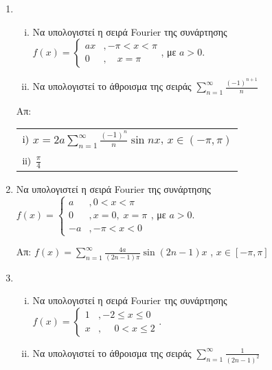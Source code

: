 



\usepackage{microtype} 
\everymath{\displaystyle}


\begin{center}
\end{center}


\vspace{\baselineskip}

\begin{enumerate}


	\item 
		\begin{enumerate}[i)]
			\item Να υπολογιστεί η σειρά  \textlatin{Fourier}  της συνάρτησης  
				$ f(x)= \begin{cases}
					ax &, - \pi < x < \pi \\
					0 &,\quad x = \pi 
				\end{cases}  $, με $ a>0 $.
			\item Να υπολογιστεί το άθροισμα της σειράς $ \sum_{n=1}^{\infty} \frac{(-1)^{n+1}}{n} $

		\end{enumerate}

		\hfill Απ: \begin{tabular}{l} 
			$ \rm i)$  $ x = 2a \sum_{n=1}^{\infty} \frac{(-1)^{n}}{n} \sin{nx} $,\; $ x \in (- \pi, \pi)$ \\
			$ \rm ii)$ $\frac{\pi}{4} $
\end{tabular}    

\item Να υπολογιστεί η σειρά \textlatin{Fourier} της συνάρτησης 
	$ f(x)= \begin{cases} 
a &, 0<x< \pi \\
0 &, x=0,\; x= \pi \\
-a &, - \pi <x < 0 
\end{cases} $, με $ a>0 $.

\hfill Απ: $ f(x) = \sum_{n=1}^{\infty} \frac{4a}{ (2n-1)\pi} \sin{(2n-1)x}  $ ,\; $ x \in [- \pi, \pi ] $

\item 
	\begin{enumerate}[i)]
		\item Να υπολογιστεί η σειρά \textlatin{Fourier} της συνάρτησης $f(x) = \begin{cases} 
		1 &, -2 \leq x \leq 0 \\
		x &, \phantom{-}0 < x \leq 2
	\end{cases} $.
\item Να υπολογιστεί το άθροισμα της σειράς $ \sum_{n=1}^{\infty} \frac{1}{(2n-1)^{2}} $
	\end{enumerate}


\end{enumerate}
